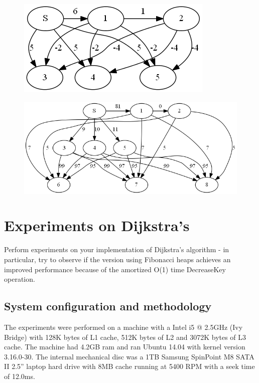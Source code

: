 \documentclass[a4paper,oneside,article,11pt]{memoir}
\begin{document}
\begin{figure}
\centering
\includegraphics[scale=0.8]{../figures/graph_neg_weights.png}
\caption{}
\label{figure:graph_neg_weights}
\end{figure}

\begin{figure}
\centering
\centerline {
\includegraphics[scale=0.5]{../figures/graph_positive_weights.png}
}
\caption{}
\label{figure:graph_neg_weights}
\end{figure}

\chapter{Experiments on Dijkstra's}
Perform experiments on your implementation of Dijkstra's algorithm - in particular, try to observe if the version using Fibonacci heaps achieves an improved performance because of the amortized O(1) time DecreaseKey operation.

\section{System configuration and methodology}
\label{sec:machine}
The experiments were performed on a machine with a Intel i5 @ 2.5GHz (Ivy Bridge) with 128K bytes of L1 cache, 512K bytes of L2 and 3072K bytes of L3 cache. The machine had 4.2GB ram and ran Ubuntu 14.04 with kernel version 3.16.0-30. The internal mechanical disc was a 1TB Samsung SpinPoint M8 SATA II 2.5'' laptop hard drive with 8MB cache running at 5400 RPM with a seek time of 12.0ms.
\end{document}
